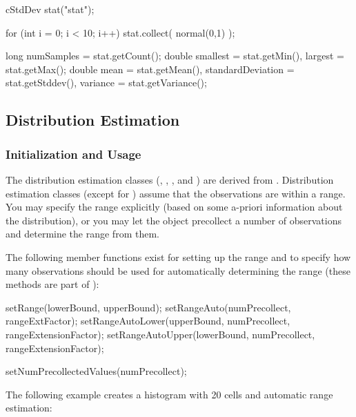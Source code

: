 \begin{cpp}
cStdDev stat("stat");

for (int i = 0; i < 10; i++)
  stat.collect( normal(0,1) );

long numSamples = stat.getCount();
double smallest = stat.getMin(),
       largest = stat.getMax();
double mean = stat.getMean(),
       standardDeviation = stat.getStddev(),
       variance = stat.getVariance();
\end{cpp}





\subsection{Distribution Estimation}

\subsubsection{Initialization and Usage}


The distribution estimation classes
(, , ,
 and ) are derived from
. Distribution estimation classes (except for
) assume that the observations are within a range.
You may specify the range explicitly (based on some a-priori information
about the distribution), or you may let the object precollect a number
of observations and determine the range from them.

The following member functions exist for setting up the range
and to specify how many observations should be used for automatically
determining the range (these methods are part of ):

\begin{cpp}
setRange(lowerBound, upperBound);
setRangeAuto(numPrecollect, rangeExtFactor);
setRangeAutoLower(upperBound, numPrecollect, rangeExtensionFactor);
setRangeAutoUpper(lowerBound, numPrecollect, rangeExtensionFactor);
\end{cpp}

\begin{cpp}
setNumPrecollectedValues(numPrecollect);
\end{cpp}

The following example creates a histogram with 20 cells and automatic
range estimation:

